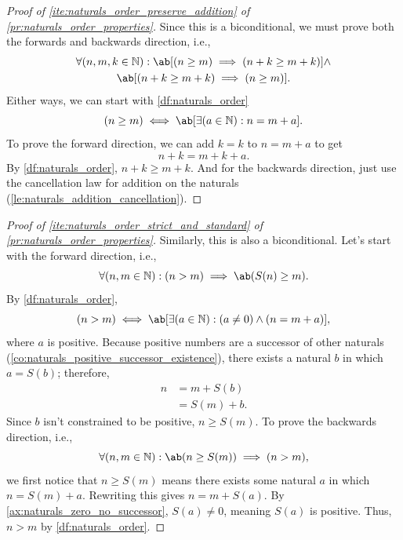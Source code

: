 \begin{proof}[Proof of \cref{ite:naturals_order_preserve_addition} of \cref{pr:naturals_order_properties}]
  Since this is a biconditional, we must prove both the forwards and backwards direction, i.e.,
  \begin{multline}
    \forall (n, m, k \in \mathbb{N}) : \ab[(n \geq m) \implies (n + k \geq m + k)] \land \\
    \ab[(n + k \geq m + k) \implies (n \geq m)].
  \end{multline}
  Either ways, we can start with \cref{df:naturals_order}
  \begin{equation}
    (n \geq m) \iff \ab[\exists (a \in \mathbb{N}) : n = m + a].
  \end{equation}
  To prove the forward direction, we can add \(k = k\) to \(n = m + a\) to get
  \begin{equation}
    n + k = m + k + a.
  \end{equation}
  By \cref{df:naturals_order}, \(n + k \geq m + k\). And for the backwards direction, just use the
  cancellation law for addition on the naturals (\cref{le:naturals_addition_cancellation}).
\end{proof}
\begin{proof}[Proof of \cref{ite:naturals_order_strict_and_standard} of \cref{pr:naturals_order_properties}]
  Similarly, this is also a biconditional. Let's start with the forward direction, i.e.,
  \begin{equation}
    \forall (n, m \in \mathbb{N}) : (n > m) \implies \ab(S(n) \geq m).
  \end{equation}
  By \cref{df:naturals_order},
  \begin{equation}
    (n > m) \iff \ab[\exists (a \in \mathbb{N}) : (a \neq 0) \land (n = m + a)],
  \end{equation}
  where \(a\) is positive. Because positive numbers are a successor of other naturals
  (\cref{co:naturals_positive_successor_existence}), there exists a natural \(b\) in which
  \(a = S(b)\); therefore,
  \begin{align}
    n & = m + S(b)  \\
      & = S(m) + b.
  \end{align}
  Since \(b\) isn't constrained to be positive, \(n \geq S(m)\). To prove the backwards direction,
  i.e.,
  \begin{equation}
    \forall (n, m \in \mathbb{N}) : \ab(n \geq S(m)) \implies (n > m),
  \end{equation}
  we first notice that \(n \geq S(m)\) means there exists some natural \(a\) in which
  \(n = S(m) + a\). Rewriting this gives \(n = m + S(a)\). By \cref{ax:naturals_zero_no_successor},
  \(S(a) \neq 0\), meaning \(S(a)\) is positive. Thus, \(n > m\) by \cref{df:naturals_order}.
\end{proof}

